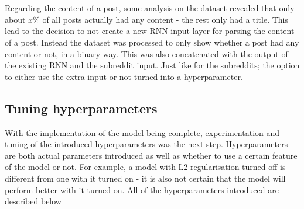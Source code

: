 \\\\
Regarding the content of a post, some analysis on the dataset revealed that only about $x\%$ of all posts actually had any content - the rest only had a title. This lead to the decision to not create a new RNN input layer for parsing the content of a post. Instead the dataset was processed to only show whether a post had any content or not, in a binary way. This was also concatenated with the output of the existing RNN and the subreddit input. Just like for the subreddits; the option to either use the extra input or not turned into a hyperparameter.
\subsection{Tuning hyperparameters}
With the implementation of the model being complete, experimentation and tuning of the introduced hyperparameters was the next step. Hyperparameters are both actual parameters introduced as well as whether to use a certain feature of the model or not. For example, a model with L2 regularisation turned off is different from one with it turned on - it is also not certain that the model will perform better with it turned on. All of the hyperparameters introduced are described below\\
